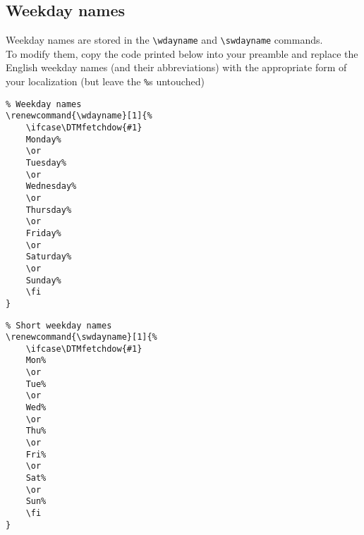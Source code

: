 \documentclass[11pt]{ltxdoc}
\begin{document}
	
	
	\subsection{Weekday names}
	Weekday names are stored in the \verb|\wdayname| and \verb|\swdayname| commands. \\
	To modify them, copy the code printed below into your preamble and replace the English weekday names (and their abbreviations) with the appropriate form of your localization (but leave the \verb|%|s untouched)
	
	\medskip
	\verb|% Weekday names| \\
	\verb|\renewcommand{\wdayname}[1]{%| \\
	\verb|    \ifcase\DTMfetchdow{#1}| \\
	\verb|    Monday%| \\
	\verb|    \or| \\
	\verb|    Tuesday%| \\
	\verb|    \or| \\
	\verb|    Wednesday%| \\
	\verb|    \or| \\
	\verb|    Thursday%| \\
	\verb|    \or| \\
	\verb|    Friday%| \\
	\verb|    \or| \\
	\verb|    Saturday%| \\
	\verb|    \or| \\
	\verb|    Sunday%| \\
	\verb|    \fi| \\
	\verb|}|
	
	\bigskip
	\verb|% Short weekday names| \\
	\verb|\renewcommand{\swdayname}[1]{%| \\
	\verb|    \ifcase\DTMfetchdow{#1}| \\
	\verb|    Mon%| \\
	\verb|    \or| \\
	\verb|    Tue%| \\
	\verb|    \or| \\
	\verb|    Wed%| \\
	\verb|    \or| \\
	\verb|    Thu%| \\
	\verb|    \or| \\
	\verb|    Fri%| \\
	\verb|    \or| \\
	\verb|    Sat%| \\
	\verb|    \or| \\
	\verb|    Sun%| \\
	\verb|    \fi| \\
	\verb|}|
	
\end{document}
